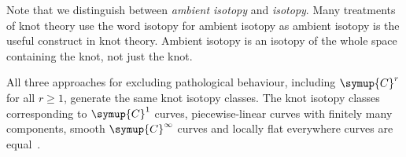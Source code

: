 \begin{remark}
    Note that we distinguish between \textit{ambient isotopy} and \textit{isotopy}. Many treatments of knot theory use the word isotopy for ambient isotopy as ambient isotopy is the useful construct in knot theory. Ambient isotopy is an isotopy of the whole space containing the knot, not just the knot.
\end{remark}

\begin{remark}
    All three approaches for excluding pathological behaviour, including \(\symup{C}^r\) for all \(r \geq 1\), generate the same knot isotopy classes. The knot isotopy classes corresponding to \(\symup{C}^1\) curves, piecewise-linear curves with finitely many components, smooth \(\symup{C}^\infty\) curves and locally flat everywhere curves are equal~\cite[\S~1.11]{cromwell}.
\end{remark}

